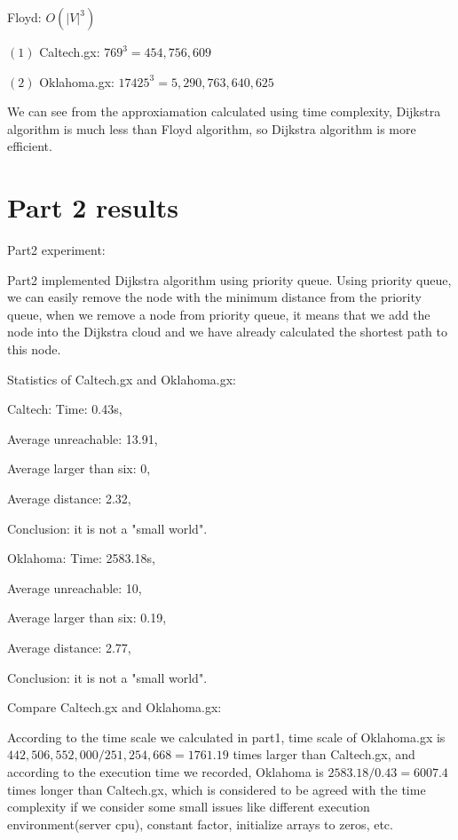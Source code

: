 \documentclass{article}
\begin{document}
Floyd: $O\left(|V|^3\right)$

$\left(1\right)$ Caltech.gx: $769^3 = 454,756,609$

$\left(2\right)$ Oklahoma.gx: $17425^3 = 5,290,763,640,625$

We can see from the approxiamation calculated using time complexity, Dijkstra algorithm
is much less than Floyd algorithm, so Dijkstra algorithm is more efficient.

\section{Part 2 results}
\label{sec:part2}
Part2 experiment:

Part2 implemented Dijkstra algorithm using priority queue. Using priority queue, we can easily remove the node 
with the minimum distance from the priority queue, when we remove a node from priority queue, it means that 
we add the node into the Dijkstra cloud and we have already calculated the shortest path to this node.

Statistics of Caltech.gx and Oklahoma.gx:

  Caltech: Time: 0.43s,

           Average unreachable: 13.91,

           Average larger than six: 0,

           Average distance: 2.32,

           Conclusion: it is not a "small world".

  Oklahoma: Time: 2583.18s, 

            Average unreachable: 10,

            Average larger than six: 0.19,

            Average distance: 2.77,

            Conclusion: it is not a "small world".

  Compare Caltech.gx and Oklahoma.gx:
  
  According to the time scale we calculated in part1, time scale of Oklahoma.gx is 
  $442,506,552,000 / 251,254,668 = 1761.19$ times larger than Caltech.gx, and 
  according to the execution time we recorded, Oklahoma is $2583.18 / 0.43 = 6007.4$ times longer
  than Caltech.gx, which is considered to be agreed with the time complexity if we consider some small issues like 
  different execution environment(server cpu), constant factor, initialize arrays to zeros, etc.
\end{document}
